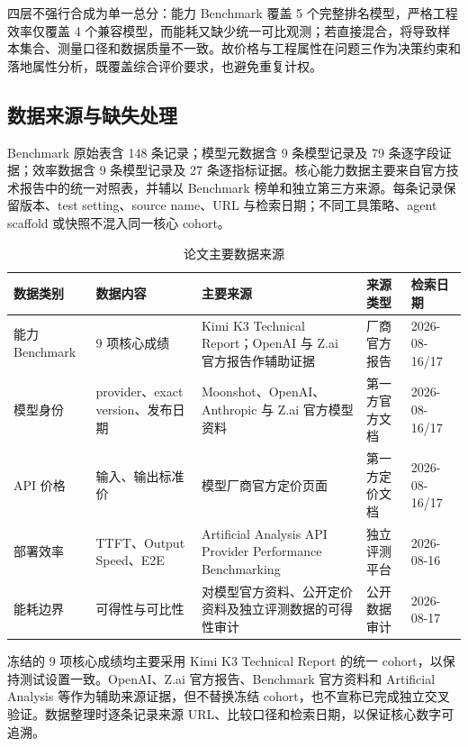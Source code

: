 \documentclass[UTF8,zihao=-4,a4paper,fontset=none]{ctexart}
\begin{document}
四层不强行合成为单一总分：能力 Benchmark 覆盖 5 个完整排名模型，严格工程效率仅覆盖 4 个兼容模型，而能耗又缺少统一可比观测；若直接混合，将导致样本集合、测量口径和数据质量不一致。故价格与工程属性在问题三作为决策约束和落地属性分析，既覆盖综合评价要求，也避免重复计权。

\subsection{数据来源与缺失处理}

Benchmark 原始表含 148 条记录；模型元数据含 9 条模型记录及 79 条逐字段证据；效率数据含 9 条模型记录及 27 条逐指标证据。核心能力数据主要来自官方技术报告中的统一对照表，并辅以 Benchmark 榜单和独立第三方来源。每条记录保留版本、test setting、source name、URL 与检索日期；不同工具策略、agent scaffold 或快照不混入同一核心 cohort。

\begin{table}[H]
  \centering
  \caption{论文主要数据来源}
  \label{tab:main-sources}
  \begin{tabularx}{\textwidth}{L{2.1cm}L{2.7cm}X L{2.3cm}C{1.7cm}}
    \toprule
    数据类别 & 数据内容 & 主要来源 & 来源类型 & 检索日期 \\
    \midrule
    能力 Benchmark & 9 项核心成绩 & Kimi K3 Technical Report；OpenAI 与 Z.ai 官方报告作辅助证据\cite{kimi-k3,openai-launch,zai-launch} & 厂商官方报告 & 2026-08-16/17 \\
    模型身份 & provider、exact version、发布日期 & Moonshot、OpenAI、Anthropic 与 Z.ai 官方模型资料\cite{kimi-blog,openai-models,anthropic-models,zai-launch} & 第一方官方文档 & 2026-08-16/17 \\
    API 价格 & 输入、输出标准价 & 模型厂商官方定价页面\cite{openai-pricing,anthropic-pricing,zhipu-pricing} & 第一方定价文档 & 2026-08-16/17 \\
    部署效率 & TTFT、Output Speed、E2E & Artificial Analysis API Provider Performance Benchmarking\cite{aa} & 独立评测平台 & 2026-08-16 \\
    能耗边界 & 可得性与可比性 & 对模型官方资料、公开定价资料及独立评测数据的可得性审计 & 公开数据审计 & 2026-08-17 \\
    \bottomrule
  \end{tabularx}
\end{table}

冻结的 9 项核心成绩均主要采用 Kimi K3 Technical Report 的统一 cohort，以保持测试设置一致。OpenAI、Z.ai 官方报告、Benchmark 官方资料和 Artificial Analysis 等作为辅助来源证据，但不替换冻结 cohort，也不宣称已完成独立交叉验证。数据整理时逐条记录来源 URL、比较口径和检索日期，以保证核心数字可追溯。
\end{document}
